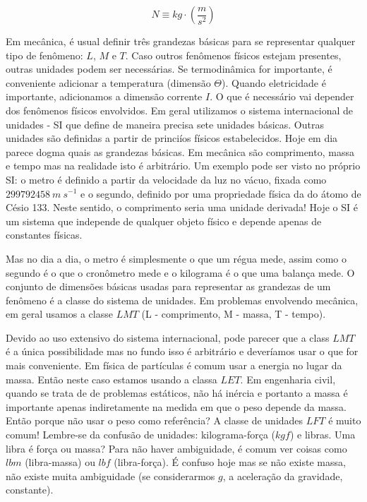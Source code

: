 \[
N \equiv kg \cdot\left(\frac{m}{s^2}\right)
\]

Em mecânica, é usual definir três grandezas básicas para se representar qualquer tipo de fenômeno: $L$, $M$ e $T$. Caso outros fenômenos físicos estejam presentes, outras unidades podem ser necessárias. Se termodinâmica for importante, é conveniente adicionar a temperatura (dimensão $\Theta$). Quando eletricidade é importante, adicionamos a dimensão corrente $I$. O que é necessário vai depender dos fenômenos físicos envolvidos. Em geral utilizamos o sistema internacional de unidades \cite{BIPM19}  - SI que define de maneira precisa sete unidades básicas. Outras unidades são definidas a partir de princiíos físicos estabelecidos. Hoje em dia parece dogma quais as grandezas básicas. Em mecânica são comprimento, massa e tempo mas na realidade isto é arbitrário. Um exemplo pode ser visto no próprio SI: o metro é definido a partir da velocidade da luz no vácuo, fixada como $299 792 458 \: m\:s^{-1}$ e o segundo, definido por uma propriedade física da do átomo de Césio 133. Neste sentido, o comprimento seria uma unidade derivada! Hoje o SI é um sistema que independe de qualquer objeto físico e depende apenas de constantes físicas.

Mas no dia a dia, o metro é simplesmente o que um régua mede, assim como o segundo é o que o cronômetro mede e o kilograma é o que uma balança mede. O conjunto de dimensões básicas usadas para representar as grandezas de um fenômeno é a classe do sistema de unidades. Em problemas envolvendo mecânica, em geral usamos a classe $LMT$ (L - comprimento, M - massa, T - tempo).

Devido ao uso extensivo do sistema internacional, pode parecer que a class $LMT$ é a única possibilidade mas no fundo isso é arbitrário e deveríamos usar o que for mais conveniente. Em física de partículas é comum usar a energia no lugar da massa. Então neste caso estamos usando a classa $LET$. Em engenharia civil, quando se trata de de problemas estáticos, não há inércia e portanto a massa é importante apenas indiretamente na medida em que o peso depende da massa. Então porque não usar o peso como referência? A classe de unidades $LFT$ é muito comum! Lembre-se da confusão de unidades: kilograma-força ($kgf$) e libras. Uma libra é força ou massa? Para não haver ambiguidade, é comum ver coisas como $lbm$ (libra-massa) ou $lbf$ (libra-força). É confuso hoje mas se não existe massa, não existe muita ambiguidade (se considerarmos $g$, a aceleração da gravidade, constante).

